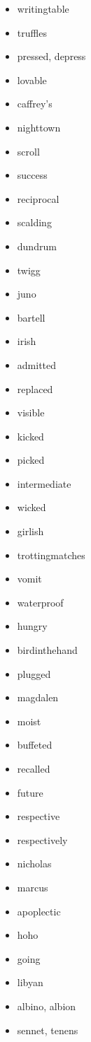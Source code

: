 \documentclass{article}
\begin{document}
\begin{itemize}
    \item writingtable
    \item truffles
    \item pressed, depress
    \item lovable
    \item caffrey's
    \item nighttown
    \item scroll
    \item success
    \item reciprocal
    \item scalding
    \item dundrum
    \item twigg
    \item juno
    \item bartell
    \item irish
    \item admitted
    \item replaced
    \item visible
    \item kicked
    \item picked
    \item intermediate
    \item wicked
    \item girlish
    \item trottingmatches
    \item vomit
    \item waterproof
    \item hungry
    \item birdinthehand
    \item plugged
    \item magdalen
    \item moist
    \item buffeted
    \item recalled
    \item future
    \item respective
    \item respectively
    \item nicholas
    \item marcus
    \item apoplectic
    \item hoho
    \item going
    \item libyan
    \item albino, albion
    \item sennet, tenens

\end{itemize}
\end{document}
